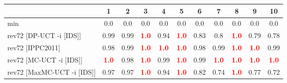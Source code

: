 \documentclass{article}
\begin{document}
\begin{tabular}{|l|r@{$\pm$}rr@{$\pm$}rr@{$\pm$}rr@{$\pm$}rr@{$\pm$}rr@{$\pm$}rr@{$\pm$}rr@{$\pm$}rr@{$\pm$}rr@{$\pm$}r|}
\hline

& \multicolumn{2}{c}{1}
& \multicolumn{2}{c}{2}
& \multicolumn{2}{c}{3}
& \multicolumn{2}{c}{4}
& \multicolumn{2}{c}{5}
& \multicolumn{2}{c}{6}
& \multicolumn{2}{c}{7}
& \multicolumn{2}{c}{8}
& \multicolumn{2}{c}{9}
& \multicolumn{2}{c|}{10}
\\
\hline
\hline
min
& \multicolumn{2}{c}{0.0}
& \multicolumn{2}{c}{0.0}
& \multicolumn{2}{c}{0.0}
& \multicolumn{2}{c}{0.0}
& \multicolumn{2}{c}{0.0}
& \multicolumn{2}{c}{0.0}
& \multicolumn{2}{c}{0.0}
& \multicolumn{2}{c}{0.0}
& \multicolumn{2}{c}{0.0}
& \multicolumn{2}{c|}{0.0}
\\
rev72 [DP-UCT -i [IDS]]
& \multicolumn{2}{c}{0.99}
& \multicolumn{2}{c}{0.99}
& \multicolumn{2}{c}{\textbf{\textcolor{red}{1.0}}}
& \multicolumn{2}{c}{0.94}
& \multicolumn{2}{c}{\textbf{\textcolor{red}{1.0}}}
& \multicolumn{2}{c}{0.83}
& \multicolumn{2}{c}{0.8}
& \multicolumn{2}{c}{\textbf{\textcolor{red}{1.0}}}
& \multicolumn{2}{c}{0.79}
& \multicolumn{2}{c|}{0.78}
\\
rev72 [IPPC2011]
& \multicolumn{2}{c}{0.98}
& \multicolumn{2}{c}{0.99}
& \multicolumn{2}{c}{\textbf{\textcolor{red}{1.0}}}
& \multicolumn{2}{c}{\textbf{\textcolor{red}{1.0}}}
& \multicolumn{2}{c}{\textbf{\textcolor{red}{1.0}}}
& \multicolumn{2}{c}{0.98}
& \multicolumn{2}{c}{0.99}
& \multicolumn{2}{c}{\textbf{\textcolor{red}{1.0}}}
& \multicolumn{2}{c}{\textbf{\textcolor{red}{1.0}}}
& \multicolumn{2}{c|}{0.99}
\\
rev72 [MC-UCT -i [IDS]]
& \multicolumn{2}{c}{\textbf{\textcolor{red}{1.0}}}
& \multicolumn{2}{c}{0.98}
& \multicolumn{2}{c}{\textbf{\textcolor{red}{1.0}}}
& \multicolumn{2}{c}{0.99}
& \multicolumn{2}{c}{\textbf{\textcolor{red}{1.0}}}
& \multicolumn{2}{c}{0.99}
& \multicolumn{2}{c}{\textbf{\textcolor{red}{1.0}}}
& \multicolumn{2}{c}{\textbf{\textcolor{red}{1.0}}}
& \multicolumn{2}{c}{\textbf{\textcolor{red}{1.0}}}
& \multicolumn{2}{c|}{\textbf{\textcolor{red}{1.0}}}
\\
rev72 [MaxMC-UCT -i [IDS]]
& \multicolumn{2}{c}{0.97}
& \multicolumn{2}{c}{0.97}
& \multicolumn{2}{c}{\textbf{\textcolor{red}{1.0}}}
& \multicolumn{2}{c}{0.94}
& \multicolumn{2}{c}{\textbf{\textcolor{red}{1.0}}}
& \multicolumn{2}{c}{0.82}
& \multicolumn{2}{c}{0.74}
& \multicolumn{2}{c}{\textbf{\textcolor{red}{1.0}}}
& \multicolumn{2}{c}{0.77}
& \multicolumn{2}{c|}{0.72}
\\

\end{tabular}
\end{document}
